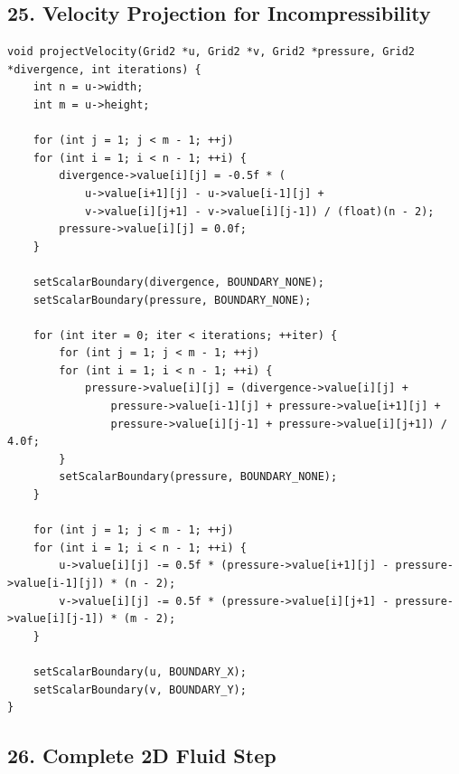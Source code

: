 \documentclass[10pt,letterpaper]{article}
\begin{document}
\subsection*{25. Velocity Projection for Incompressibility}

\begin{verbatim}
void projectVelocity(Grid2 *u, Grid2 *v, Grid2 *pressure, Grid2 *divergence, int iterations) {
    int n = u->width;
    int m = u->height;

    for (int j = 1; j < m - 1; ++j)
    for (int i = 1; i < n - 1; ++i) {
        divergence->value[i][j] = -0.5f * (
            u->value[i+1][j] - u->value[i-1][j] +
            v->value[i][j+1] - v->value[i][j-1]) / (float)(n - 2);
        pressure->value[i][j] = 0.0f;
    }

    setScalarBoundary(divergence, BOUNDARY_NONE);
    setScalarBoundary(pressure, BOUNDARY_NONE);

    for (int iter = 0; iter < iterations; ++iter) {
        for (int j = 1; j < m - 1; ++j)
        for (int i = 1; i < n - 1; ++i) {
            pressure->value[i][j] = (divergence->value[i][j] +
                pressure->value[i-1][j] + pressure->value[i+1][j] +
                pressure->value[i][j-1] + pressure->value[i][j+1]) / 4.0f;
        }
        setScalarBoundary(pressure, BOUNDARY_NONE);
    }

    for (int j = 1; j < m - 1; ++j)
    for (int i = 1; i < n - 1; ++i) {
        u->value[i][j] -= 0.5f * (pressure->value[i+1][j] - pressure->value[i-1][j]) * (n - 2);
        v->value[i][j] -= 0.5f * (pressure->value[i][j+1] - pressure->value[i][j-1]) * (m - 2);
    }

    setScalarBoundary(u, BOUNDARY_X);
    setScalarBoundary(v, BOUNDARY_Y);
}
\end{verbatim}

\subsection*{26. Complete 2D Fluid Step}
\end{document}

